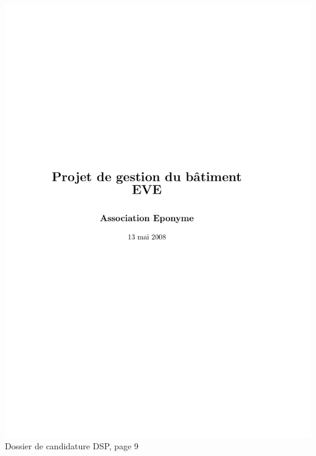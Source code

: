 \includegraphics[scale=0.85,trim=20mm 20mm 20mm 20mm,clip,page=9]{annexes/candidature_dsp.pdf} \\
Dossier de candidature DSP, page 9
\newpage
